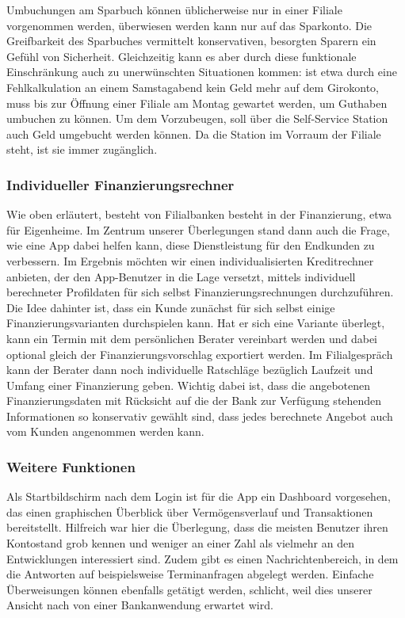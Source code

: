    Umbuchungen am Sparbuch können üblicherweise nur in einer Filiale vorgenommen werden, überwiesen werden kann nur auf das Sparkonto. Die Greifbarkeit des Sparbuches vermittelt konservativen, besorgten Sparern ein Gefühl von Sicherheit. Gleichzeitig kann es aber durch diese funktionale Einschränkung auch zu unerwünschten Situationen kommen: ist etwa durch eine Fehlkalkulation an einem Samstagabend kein Geld mehr auf dem Girokonto, muss bis zur Öffnung einer Filiale am Montag gewartet werden, um Guthaben umbuchen zu können. Um dem Vorzubeugen, soll über die Self-Service Station auch Geld umgebucht werden können. Da die Station im Vorraum der Filiale steht, ist sie immer zugänglich.   
    
\subsubsection{Individueller Finanzierungsrechner}
Wie oben erläutert, besteht von Filialbanken besteht in der Finanzierung, etwa für Eigenheime. Im Zentrum unserer Überlegungen stand dann auch die Frage, wie eine App dabei helfen kann, diese Dienstleistung für den Endkunden zu verbessern. Im Ergebnis möchten wir einen individualisierten Kreditrechner anbieten, der den App-Benutzer in die Lage versetzt, mittels individuell berechneter Profildaten für sich selbst Finanzierungsrechnungen durchzuführen. Die Idee dahinter ist, dass ein Kunde zunächst für sich selbst einige Finanzierungsvarianten durchspielen kann. Hat er sich eine Variante überlegt, kann ein Termin mit dem persönlichen Berater vereinbart werden und dabei optional gleich der Finanzierungsvorschlag exportiert werden. Im Filialgespräch kann der Berater dann noch individuelle Ratschläge bezüglich Laufzeit und Umfang einer Finanzierung geben. Wichtig dabei ist, dass die angebotenen Finanzierungsdaten  mit Rücksicht auf die der Bank zur Verfügung stehenden Informationen so konservativ gewählt sind, dass jedes berechnete Angebot auch vom Kunden angenommen werden kann.
 
\subsubsection{Weitere Funktionen}
    Als Startbildschirm nach dem Login ist für die App ein Dashboard vorgesehen, das einen graphischen Überblick über Vermögensverlauf und Transaktionen bereitstellt. Hilfreich war hier die Überlegung, dass die meisten Benutzer ihren Kontostand grob kennen und weniger an einer Zahl als vielmehr an den Entwicklungen interessiert sind. Zudem gibt es einen Nachrichtenbereich, in dem die Antworten auf beispielsweise Terminanfragen abgelegt werden. Einfache Überweisungen können ebenfalls getätigt werden, schlicht, weil dies unserer Ansicht nach von einer Bankanwendung erwartet wird.
    

